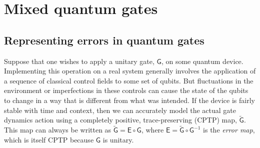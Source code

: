 \documentclass[aps,nofootinbib,pra,notitlepage,twocolumn]{revtex4-1}
\begin{document}
\section{Mixed quantum gates}
\label{sec:representing_quantum_gates}

\subsection{Representing errors in quantum gates}
\noindent Suppose that one wishes to apply a unitary gate, $\mathsf{G}$, on some quantum device. Implementing this operation on a real system generally involves the application of a sequence of classical control fields to some set of qubits.  But fluctuations in the environment or imperfections in these controls can cause the state of the qubits to change in a way that is different from what was intended. If the device is fairly stable with time and context\cite{1810.05651}, then we can accurately model the actual gate dynamics action using a completely positive, trace-preserving (CPTP) map, $\mathsf{\tilde G}$. This map can always be written as $\mathsf{\tilde G} = \mathsf{E}\circ\mathsf{G}$, where $\mathsf{E} = \mathsf{\tilde G}\circ\mathsf{G}^{-1}$ is the \emph{error map}, which is itself CPTP because $\mathsf{G}$ is unitary.
\end{document}
